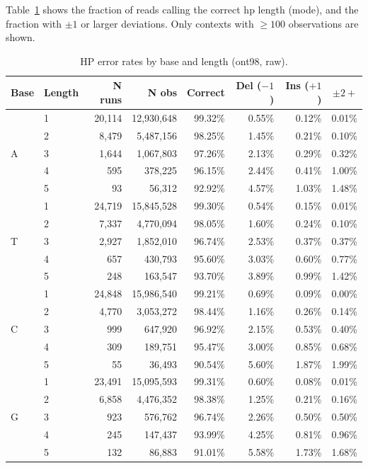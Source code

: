 \documentclass[11pt]{article}
\begin{document}
Table~\ref{tab:hp_error} shows the fraction of reads calling the correct hp
length (mode), and the fraction with $\pm 1$ or larger deviations. Only
contexts with $\geq 100$ observations are shown.

\begin{table}[h]
\centering
\small
\caption{HP error rates by base and length (ont98, raw).}
\label{tab:hp_error}
\begin{tabular}{llrrrrrr}
\toprule
Base & Length & N runs & N obs & Correct & Del ($-1$) & Ins ($+1$) & $\pm 2{+}$ \\
\midrule
\multirow{5}{*}{A}
  & 1 & 20,114 & 12,930,648 & 99.32\% & 0.55\% & 0.12\% & 0.01\% \\
  & 2 & 8,479 & 5,487,156 & 98.25\% & 1.45\% & 0.21\% & 0.10\% \\
  & 3 & 1,644 & 1,067,803 & 97.26\% & 2.13\% & 0.29\% & 0.32\% \\
  & 4 & 595 & 378,225 & 96.15\% & 2.44\% & 0.41\% & 1.00\% \\
  & 5 & 93 & 56,312 & 92.92\% & 4.57\% & 1.03\% & 1.48\% \\
\midrule
\multirow{5}{*}{T}
  & 1 & 24,719 & 15,845,528 & 99.30\% & 0.54\% & 0.15\% & 0.01\% \\
  & 2 & 7,337 & 4,770,094 & 98.05\% & 1.60\% & 0.24\% & 0.10\% \\
  & 3 & 2,927 & 1,852,010 & 96.74\% & 2.53\% & 0.37\% & 0.37\% \\
  & 4 & 657 & 430,793 & 95.60\% & 3.03\% & 0.60\% & 0.77\% \\
  & 5 & 248 & 163,547 & 93.70\% & 3.89\% & 0.99\% & 1.42\% \\
\midrule
\multirow{5}{*}{C}
  & 1 & 24,848 & 15,986,540 & 99.21\% & 0.69\% & 0.09\% & 0.00\% \\
  & 2 & 4,770 & 3,053,272 & 98.44\% & 1.16\% & 0.26\% & 0.14\% \\
  & 3 & 999 & 647,920 & 96.92\% & 2.15\% & 0.53\% & 0.40\% \\
  & 4 & 309 & 189,751 & 95.47\% & 3.00\% & 0.85\% & 0.68\% \\
  & 5 & 55 & 36,493 & 90.54\% & 5.60\% & 1.87\% & 1.99\% \\
\midrule
\multirow{5}{*}{G}
  & 1 & 23,491 & 15,095,593 & 99.31\% & 0.60\% & 0.08\% & 0.01\% \\
  & 2 & 6,858 & 4,476,352 & 98.38\% & 1.25\% & 0.21\% & 0.16\% \\
  & 3 & 923 & 576,762 & 96.74\% & 2.26\% & 0.50\% & 0.50\% \\
  & 4 & 245 & 147,437 & 93.99\% & 4.25\% & 0.81\% & 0.96\% \\
  & 5 & 132 & 86,883 & 91.01\% & 5.58\% & 1.73\% & 1.68\% \\
\bottomrule
\end{tabular}
\end{table}
\end{document}
